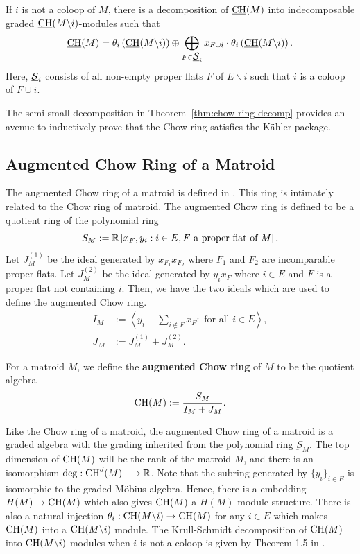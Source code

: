 \documentclass{puthesis-UG}
\begin{document}
\begin{thm}  \label{thm:chow-ring-decomp}
	If $i$ is not a coloop of $M$, there is a decomposition of $\underbar{$\operatorname{CH}$}(M)$ into indecomposable graded $\underbar{$\operatorname{CH}$}(M \backslash i)$-modules such that 
	\[
		\underbar{$\operatorname{CH}$}(M) = \theta_i \left ( \underbar{$\operatorname{CH}$} (M \backslash i) \right ) \oplus \bigoplus_{F \in \underbar{$\mathcal{S}$}_i} x_{F \cup i} \cdot \theta_i \left ( \underbar{$\operatorname{CH}$} (M \backslash i) \right ).
	\]
	Here, $\underbar{$\mathcal{S}$}_i$ consists of all non-empty proper flats $F$ of $E \backslash i$ such that $i$ is a coloop of $F \cup i$. 
\end{thm}

The semi-small decomposition in Theorem~\ref{thm:chow-ring-decomp} provides an avenue to inductively prove that the Chow ring satisfies the K\"ahler package. 

\subsection{Augmented Chow Ring of a Matroid}

The augmented Chow ring of a matroid is defined in \cite{huh-semi-small}. This ring is intimately related to the Chow ring of matroid. The augmented Chow ring is defined to be a quotient ring of the polynomial ring
\[
	S_M := \mathbb{R} \left [x_F, y_i : i \in E, F \text{ a proper flat of } M \right ].
\]
Let $J_M^{(1)}$ be the ideal generated by $x_{F_1} x_{F_2}$ where $F_1$ and $F_2$ are incomparable proper flats. Let $J_M^{(2)}$ be the ideal generated by $y_i x_F$ where $i \in E$ and $F$ is a proper flat not containing $i$. Then, we have the two ideals which are used to define the augmented Chow ring. 
\begin{align*}
	I_M & := \left \langle y_i - \sum_{i \notin F} x_F : \text{ for all } i \in E \right \rangle,\\
	J_M & := J_M^{(1)} + J_M^{(2)}.
\end{align*}

\begin{defn} \label{def:augmented-chow-ring-of-matroid}
	For a matroid $M$, we define the \textbf{augmented Chow ring} of $M$ to be the quotient algebra
	\[
		\operatorname{CH}(M) := \frac{S_M}{I_M + J_M}.
	\]
\end{defn}
Like the Chow ring of a matroid, the augmented Chow ring of a matroid is a graded algebra with the grading inherited from the polynomial ring $\underbar{S}_M$. The top dimension of $\operatorname{CH}(M)$ will be the rank of the matroid $M$, and there is an isomorphism $\deg : \operatorname{CH}^d(M) \longrightarrow \mathbb{R}$. Note that the subring generated by $\{y_i\}_{i \in E}$ is isomorphic to the graded M\"obius algebra. Hence, there is a embedding $H(M) \to \operatorname{CH}(M)$ which also gives $\operatorname{CH}(M)$ a $H(M)$-module structure. There is also a natural injection $\theta_i : \operatorname{CH}(M \backslash i) \to \operatorname{CH}(M)$ for any $i \in E$ which makes $\operatorname{CH}(M)$ into a $\operatorname{CH}(M \backslash i)$ module. The Krull-Schmidt decomposition of $\operatorname{CH}(M)$ into $\operatorname{CH}(M \backslash i)$ modules when $i$ is not a coloop is given by Theorem 1.5 in \cite{huh-semi-small}.
\end{document}
